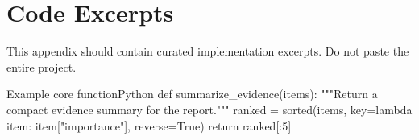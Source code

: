 \chapter{Code Excerpts}

This appendix should contain curated implementation excerpts. Do not paste the entire project.

\begin{codebox}{Example core function}{Python}
def summarize_evidence(items):
    """Return a compact evidence summary for the report."""
    ranked = sorted(items, key=lambda item: item["importance"], reverse=True)
    return ranked[:5]
\end{codebox}
